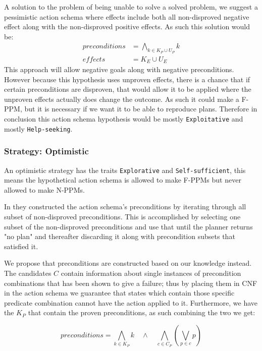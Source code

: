 \documentclass[../Master.tex]{subfiles}
\begin{document}
	A solution to the problem of being unable to solve a solved problem, we suggest a pessimistic action schema where effects include both all non-disproved negative effect along with the non-disproved positive effects.
	As such this solution would be:
		\begin{equation}
			\begin{split}			
				preconditions&= \bigwedge\limits_{k \in K_P \cup U_P} k \\
				effects&=  K_E \cup U_E
			\end{split}
		\end{equation}
	This approach will allow negative goals along with negative preconditions. 
	However because this hypothesis uses unproven effects, there is a chance that if certain preconditions are disproven, that would allow it to be applied where the unproven effects actually does change the outcome.
	As such it could make a F-PPM, but it is necessary if we want it to be able to reproduce plans. 
	Therefore in conclusion this action schema hypothesis would be mostly \texttt{Exploitative} and mostly \texttt{Help-seeking}.
	
	

\subsubsection{Strategy: Optimistic} 

	An optimistic strategy has the traits \texttt{Explorative} and \texttt{Self-sufficient},
	this means the hypothetical action schema is allowed to make F-PPMs but never allowed to make N-PPMs.

	In \cite{Walsh2008} they constructed the action schema's preconditions by iterating through all subset of non-disproved preconditions.
	This is accomplished by selecting one subset of the non-disproved preconditions and use that until the planner returns "no plan" and thereafter discarding it along with precondition subsets that satisfied it.

	We propose that preconditions are constructed based on our knowledge instead.
	The candidates $C$ contain information about single instances of precondition combinations that has been shown to give a failure;
	thus by placing them in CNF in the action schema we guarantee that states which contain those specific predicate combination cannot have the action applied to it.
	Furthermore, we have the $K_P$ that contain the proven preconditions, as such combining the two we get:

	\begin{equation} \label{eq:nca:opt-preconds}
		preconditions = \bigwedge\limits_{k \in K_P} k \quad \land \quad  \bigwedge \limits_{c \in C_P} \left( \bigvee \limits_{p \in c} p\right)
	\end{equation}
\end{document}
